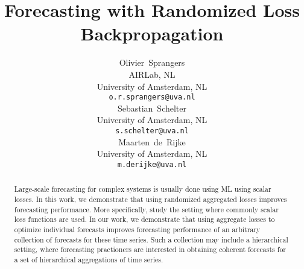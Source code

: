 \documentclass{article}
\title{Forecasting with Randomized Loss Backpropagation}
\author{%
  Olivier~Sprangers \\
  AIRLab, NL \\
  University of Amsterdam, NL\\
  \texttt{o.r.sprangers@uva.nl} \\
  \And
  Sebastian~Schelter \\
  University of Amsterdam, NL \\
  \texttt{s.schelter@uva.nl} \\
  \And
  Maarten~de~Rijke \\
  University of Amsterdam, NL \\
  \texttt{m.derijke@uva.nl} \\
}
\begin{document}
\maketitle

\begin{abstract}
  Large-scale forecasting for complex systems is usually done using ML using scalar losses. In this work, we demonstrate that using randomized aggregated losses improves forecasting performance. More specifically, study the setting where commonly scalar loss functions are used. In our work, we demonstrate that using aggregate losses to optimize individual forecasts improves forecasting performance of an arbitrary collection of forecasts for these time series. Such a collection may include a hierarchical setting, where forecasting practioners are interested in obtaining coherent forecasts for a set of hierarchical aggregations of time series.

\end{abstract}
\end{document}
